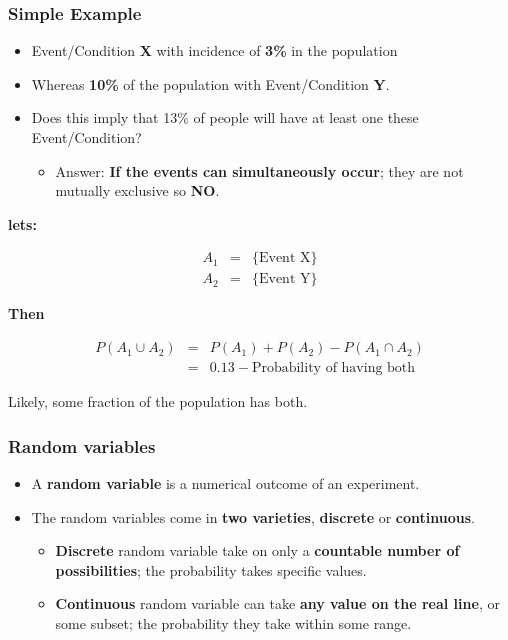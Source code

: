 \documentclass[10pt,article]{article}
\begin{document}
\subsubsection{Simple Example}
\label{sec:orgc5fb3a1}
\begin{itemize}
\item Event/Condition \textbf{X} with incidence of \textbf{3\%} in the population
\item Whereas \textbf{10\%} of the population with Event/Condition \textbf{Y}.
\item Does this imply that 13\% of people will have at least one these Event/Condition?
\begin{itemize}
\item Answer: \textbf{If the events can simultaneously occur}; they are not mutually exclusive so \textbf{NO}.
\end{itemize}
\end{itemize}
\textbf{lets:}

\begin{eqnarray*}
    A_1 & = & \{\mbox{Event X}\} \\
    A_2 & = & \{\mbox{Event Y}\}
\end{eqnarray*}

\textbf{Then}

\begin{eqnarray*}
    P(A_1 \cup A_2 ) & = & P(A_1) + P(A_2) - P(A_1 \cap A_2) \\
   & = & 0.13 - \mbox{Probability of having both}
\end{eqnarray*}

Likely, some fraction of the population has both.

\subsubsection{Random variables}
\label{sec:orgf01fd57}
\begin{itemize}
\item A \textbf{random variable} is a numerical outcome of an experiment.
\item The random variables come in \textbf{two varieties}, \textbf{discrete} or \textbf{continuous}.
\begin{itemize}
\item \textbf{Discrete} random variable take on only a \textbf{countable number of possibilities}; the probability takes specific values.
\item \textbf{Continuous} random variable can take \textbf{any value on the real line}, or some subset; the probability they take within some range.
\end{itemize}
\end{itemize}
\end{document}
